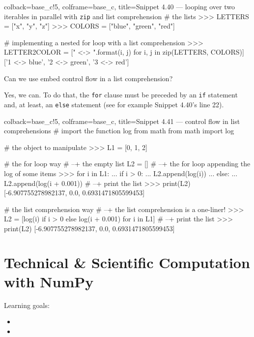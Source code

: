 \documentclass[a4paper,11pt]{book}
\numberwithin{figure}{chapter}
\numberwithin{table}{chapter}
\newcommand{\question}[1]{%
    \begin{tcolorbox}[colback=comp_c!10,colframe=comp_c,sidebyside align=top,width=\linewidth,before skip=1ex]
        #1
    \end{tcolorbox}
    \switchcolumn%
}
\newcommand{\note}[1]{%
    \begin{tcolorbox}[colback=white!0,colframe=white!10,width=\linewidth,before skip=1ex]
        #1
    \end{tcolorbox}
}
\begin{document}
\begin{pythoncode}[linenos=true,]{colback=base_c!5, colframe=base_c, title=\sffamily Snippet 4.40 ---  looping over two iterables in parallel with \texttt{zip} and list comprehension}
# the lists 
>>> LETTERS = ["x", "y", "z"]
>>> COLORS = ["blue", "green", "red"]

# implementing a nested for loop with a list comprehension
>>> LETTER2COLOR = ["{} <-> {}".format(i, j) for i, j in zip(LETTERS, COLORS)]
['1 <-> blue', '2 <-> green', '3 <-> red']
\end{pythoncode}

\begin{paracol}{2}
	\question{\raggedright Can we use embed control flow in a list comprehension?}
	\note{Yes, we can. To do that, the \texttt{for} clause must be preceded by an \texttt{if} statement and, at least, an \texttt{else} statement (see for example Snippet 4.40's line 22). }
\end{paracol}

\begin{pythoncode}[linenos=true,]{colback=base_c!5, colframe=base_c, title=\sffamily Snippet 4.41 --- control flow in list comprehensions}
# import the function log from math 
from math import log

# the object to manipulate
>>> L1 = [0, 1, 2]

# the for loop way
# --+ the empty list 
L2 = []
# --+ the for loop appending the log of some items
>>> for i in L1:
...     if i > 0:
...         L2.append(log(i))
...     else:
...         L2.append(log(i + 0.001))
# --+ print the list
>>> print(L2)
[-6.907755278982137, 0.0, 0.6931471805599453]

# the list comprehension way
# --+ the list comprehension is a one-liner!
>>> L2 = [log(i) if i > 0 else log(i + 0.001) for i in L1]
# --+ print the list
>>> print(L2)
[-6.907755278982137, 0.0, 0.6931471805599453]
\end{pythoncode}

\theendnotes

\chapter{Technical \& Scientific Computation with NumPy}
\label{ch:tech_sci_computation}

\vspace{1em}

Learning goals:

\begin{itemize}
	\item 
	\item 
\end{itemize}
\end{document}
